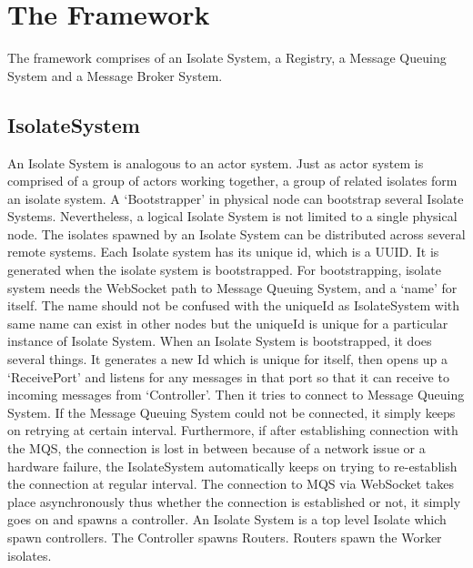 \section{The Framework}
The framework comprises of an Isolate System, a Registry, a Message Queuing System and a Message Broker System.
  \subsection{IsolateSystem}
  An Isolate System is analogous to an actor system. Just as actor system is comprised of a group of actors working together, a group of related isolates form an isolate system. A ‘Bootstrapper’ in physical node can bootstrap several Isolate Systems. Nevertheless, a logical Isolate System is not limited to a single physical node. The isolates spawned by an Isolate System can be distributed across several remote systems.
  Each Isolate system has its unique id, which is a UUID. It is generated when the isolate system is bootstrapped. For bootstrapping, isolate system needs the WebSocket path to Message Queuing System, and a ‘name’ for itself. The name should not be confused with the uniqueId as IsolateSystem with same name can exist in other nodes but the uniqueId is unique for a particular instance of Isolate System.
  When an Isolate System is bootstrapped, it does several things. It generates a new Id which is unique for itself, then opens up a ‘ReceivePort’ and listens for any messages in that port so that it can receive to incoming messages from ‘Controller’. Then it tries to connect to Message Queuing System. If the Message Queuing System could not be connected, it simply keeps on retrying at certain interval. Furthermore, if after establishing connection with the MQS, the connection is lost in between because of a network issue or a hardware failure, the IsolateSystem automatically keeps on trying to re-establish the connection at regular interval. The connection to MQS via WebSocket takes place asynchronously thus whether the connection is established or not, it simply goes on and spawns a controller.
  An Isolate System is a top level Isolate which spawn controllers. The Controller spawns Routers. Routers spawn the Worker isolates.

